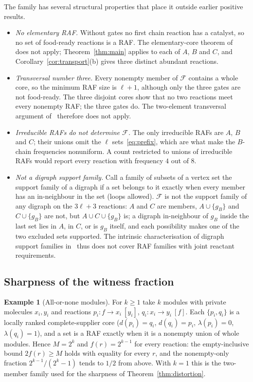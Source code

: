 \documentclass[11pt,a4paper]{article}
\theoremstyle{plain}
\theoremstyle{definition}
\newtheorem{example}[theorem]{Example}
\theoremstyle{remark}
\newcommand{\FF}{\mathcal F}
\begin{document}
The family has several structural properties that place it outside earlier positive results.
\begin{itemize}
\item \emph{No elementary RAF.} Without gates no first chain reaction has a catalyst, so no set of food-ready reactions is a RAF. The elementary-core theorem of~\cite{elementary2026} does not apply; Theorem~\ref{thm:main} applies to each of $A$, $B$ and $C$, and Corollary~\ref{cor:transport}(b) gives three distinct abundant reactions.
\item \emph{Transversal number three.} Every nonempty member of $\FF$ contains a whole core, so the minimum RAF size is $\ell+1$, although only the three gates are not food-ready. The three disjoint cores show that no two reactions meet every nonempty RAF; the three gates do. The two-element transversal argument of~\cite[Lemma~5.6]{elementary2026} therefore does not apply.
\item \emph{Irreducible RAFs do not determine $\FF$.} The only irreducible RAFs are $A$, $B$ and $C$; their unions omit the $\ell$ sets~\eqref{eq:prefix}, which are what make the $B$-chain frequencies nonuniform. A count restricted to unions of irreducible RAFs would report every reaction with frequency $4$ out of $8$.
\item \emph{Not a digraph support family.} Call a family of subsets of a vertex set the support family of a digraph if a set belongs to it exactly when every member has an in-neighbour in the set (loops allowed). $\FF$ is not the support family of any digraph on the $3\ell+3$ reactions: $A$ and $C$ are members, $A\cup\{g_B\}$ and $C\cup\{g_B\}$ are not, but $A\cup C\cup\{g_B\}$ is; a digraph in-neighbour of $g_B$ inside the last set lies in $A$, in $C$, or is $g_B$ itself, and each possibility makes one of the two excluded sets supported. The intrinsic characterisation of digraph support families in~\cite{digraph2026} thus does not cover RAF families with joint reactant requirements.
\end{itemize}

\subsection{Sharpness of the witness fraction}

\begin{example}[All-or-none modules]\label{ex:modules}
For $k\ge1$ take $k$ modules with private molecules $x_i,y_i$ and reactions $p_i:f\to x_i\ [y_i]$, $q_i:x_i\to y_i\ [f]$. Each $\{p_i,q_i\}$ is a locally ranked complete-supplier core ($d(p_i)=q_i$, $d(q_i)=p_i$, $\lambda(p_i)=0$, $\lambda(q_i)=1$), and a set is a RAF exactly when it is a nonempty union of whole modules. Hence $M=2^k$ and $f(r)=2^{k-1}$ for every reaction: the empty-inclusive bound $2f(r)\ge M$ holds with equality for every $r$, and the nonempty-only fraction $2^{k-1}/(2^k-1)$ tends to $1/2$ from above. With $k=1$ this is the two-member family used for the sharpness of Theorem~\ref{thm:distortion}.
\end{example}
\end{document}
